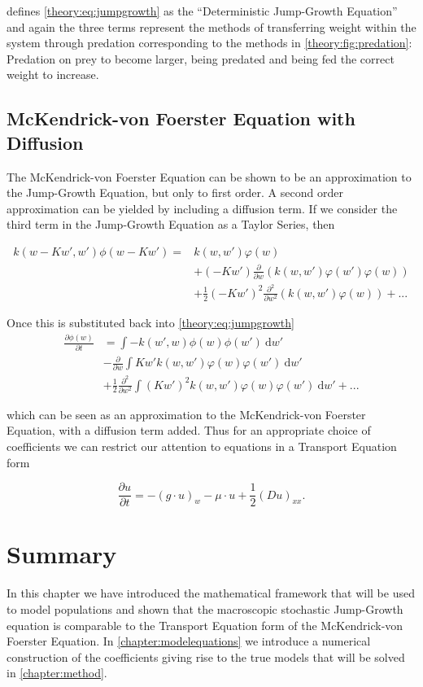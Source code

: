 \documentclass[../main.tex]{subfiles}
\begin{document}
  \cite{datta2010} defines \autoref{theory:eq:jumpgrowth} as the ``Deterministic Jump-Growth Equation'' and again the three terms represent the methods of transferring weight within the system through predation corresponding to the methods in \autoref{theory:fig:predation}: Predation on prey to become larger, being predated and being fed the correct weight to increase.

  \subsection{McKendrick-von Foerster Equation with Diffusion}\label{theory:sec:mvfdiffusion}
  The McKendrick-von Foerster Equation can be shown to be an approximation to the Jump-Growth Equation, but only to first order. A second order approximation can be yielded by including a diffusion term. If we consider the third term in the Jump-Growth Equation as a Taylor Series, then

  \begin{align}
    k(w - Kw', w')\phi(w - K w')
    = & k(w, w') \varphi(w) \nonumber \\
      & + (-K w') \frac{\partial}{\partial w} \left(k(w, w')\varphi(w')\varphi(w)\right) \nonumber \\
      & + \frac{1}{2}(-K w')^2 \frac{\partial^2}{\partial w^2} \left(k(w, w')\varphi(w)\right) + ...
  \end{align}

  Once this is substituted back into \autoref{theory:eq:jumpgrowth}
  \begin{align}\label{theory:eq:jumpdiffusion}
    \frac{\partial \phi(w)}{\partial t}
    & = \int - k(w', w) \phi(w)\phi(w')  \: \mathrm{d}w' \nonumber \\
    & - \frac{\partial}{\partial w} \int K w' k(w, w')\varphi(w)\varphi(w') \: \mathrm{d}w' \nonumber \\
    & + \frac{1}{2}\frac{\partial^2}{\partial w^2} \int (K w')^2 k(w, w')\varphi(w)\varphi(w') \: \mathrm{d}w' + ...
  \end{align}

  which can be seen as an approximation to the McKendrick-von Foerster Equation, with a diffusion term added. Thus for an appropriate choice of coefficients we can restrict our attention to equations in a Transport Equation form

  \begin{equation}\label{theory:eq:jumptransport}
    \frac{\partial u}{\partial t} = - (g \cdot u)_w - \mu \cdot u + \frac{1}{2}(D u)_{xx}.
  \end{equation}

  \section{Summary}
  In this chapter we have introduced the mathematical framework that will be used to model populations and shown that the macroscopic stochastic Jump-Growth equation is comparable to the Transport Equation form of the McKendrick-von Foerster Equation. In \autoref{chapter:modelequations} we introduce a numerical construction of the coefficients giving rise to the true models that will be solved in \autoref{chapter:method}.
\end{document}
